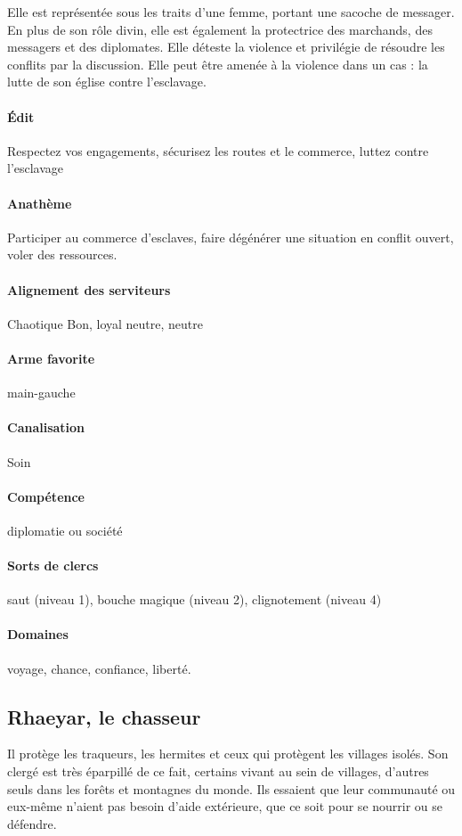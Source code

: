 \documentclass[10pt,a4paper]{book}
\begin{document}
Elle est représentée sous les traits d'une femme, portant une sacoche de messager. En plus de son rôle divin, elle est également la protectrice des marchands, des messagers et des diplomates. Elle déteste la violence et privilégie de résoudre les conflits par la discussion. Elle peut être amenée à la violence dans un cas : la lutte de son église contre l'esclavage.
\paragraph{Édit} Respectez vos engagements, sécurisez les routes et le commerce, luttez contre l'esclavage
\paragraph{Anathème} Participer au commerce d'esclaves, faire dégénérer une situation en conflit ouvert, voler des ressources.
\paragraph{Alignement des serviteurs} Chaotique Bon, loyal neutre, neutre
\paragraph{Arme favorite }main-gauche
\paragraph{Canalisation} Soin
\paragraph{Compétence}diplomatie ou société
\paragraph{Sorts de clercs} saut (niveau 1), bouche magique (niveau 2), clignotement (niveau 4)
\paragraph{Domaines }voyage, chance, confiance, liberté.
\subsection{Rhaeyar, le chasseur}
Il protège les traqueurs, les hermites et ceux qui protègent les villages isolés. Son clergé est très éparpillé de ce fait, certains vivant au sein de villages, d'autres seuls dans les forêts et montagnes du monde. Ils essaient que leur communauté ou eux-même n'aient pas besoin d'aide extérieure, que ce soit pour se nourrir ou se défendre.
\end{document}
